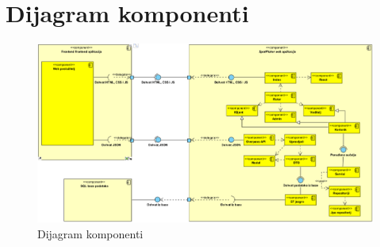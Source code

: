 \eject 


\section{Dijagram komponenti}

\begin{figure}[H]
	\includegraphics[width=\textwidth]{slike/dijagram_komponenti.png} %
	\centering
	\caption{Dijagram komponenti}
	\label{fig:dijagramaktivnosti}
\end{figure}


\eject 


